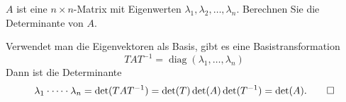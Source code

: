 $A$ ist eine $n\times n$-Matrix mit Eigenwerten
$\lambda_1,\lambda_2,\dots,\lambda_n$.
Berechnen Sie die Determinante von $A$.


\begin{loesung}
Verwendet man die Eigenvektoren als Basis, gibt es eine Basistransformation
\[
TAT^{-1}=\operatorname{diag}(\lambda_1,\dots,\lambda_n)
\]
Dann ist die Determinante
\[
\lambda_1\cdot \dots\cdot\lambda_n
=
\det(TAT^{-1})
=
\det(T)\det(A)\det(T^{-1})
=
\det(A).
\qedhere
\]
\end{loesung}
